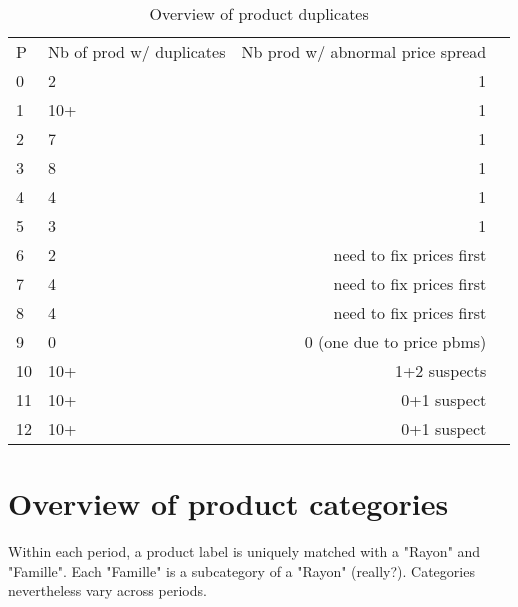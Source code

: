 \documentclass[11pt]{article}
\begin{document}
\begin{table}[H]
\renewcommand{\arraystretch}{0.7}%
\caption{Overview of product duplicates}
\small
\begin{tabular}{llrr}
\toprule
\toprule
P  & Nb of prod w/ duplicates & Nb prod w/ abnormal price spread   \\
0  &   2                      &  1                                 \\
1  &  10+                     &  1                                 \\
2  &   7                      &  1                                 \\
3  &   8                      &  1                                 \\
4  &   4                      &  1                                 \\
5  &   3                      &  1                                 \\
6  &   2                      & need to fix prices first           \\
7  &   4                      & need to fix prices first           \\
8  &   4                      & need to fix prices first           \\
9  &   0                      &  0 (one due to price pbms)         \\
10 &  10+                     & 1+2 suspects                       \\
11 &  10+                     & 0+1 suspect                        \\
12 &  10+                     & 0+1 suspect                        \\
\bottomrule
\end{tabular}
\end{table}

\section{Overview of product categories}

Within each period, a product label is uniquely matched with a "Rayon" and "Famille". Each "Famille" is a subcategory of a "Rayon" (really?). Categories nevertheless vary across periods.
\end{document}
